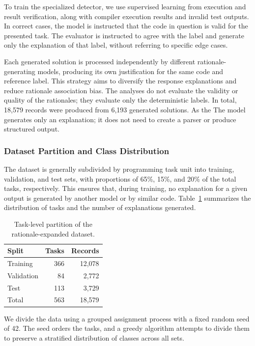 To train the specialized detector, we use supervised learning from execution and result verification, along with compiler execution results and invalid test outputs. In correct cases, the model is instructed that the code in question is valid for the presented task. The evaluator is instructed to agree with the label and generate only the explanation of that label, without referring to specific edge cases.

Each generated solution is processed independently by different rationale-generating models, producing its own justification for the same code and reference label. This strategy aims to diversify the response explanations and reduce rationale association bias. The analyses do not evaluate the validity or quality of the rationales; they evaluate only the deterministic labels. In total, 18,579 records were produced from 6,193 generated solutions. As the
The model generates only an explanation; it does not need to create a parser or produce structured output.

\subsubsection{Dataset Partition and Class Distribution}

The dataset is generally subdivided by programming task unit into training, validation, and test sets, with proportions of 65\%, 15\%, and 20\% of the total tasks, respectively. This ensures that, during training, no explanation for a given output is generated by another model or by similar code. Table~\ref{tab:dataset_split} summarizes the distribution of tasks and the number of explanations generated.

\begin{table}[htbp]
\centering
\caption{Task-level partition of the rationale-expanded dataset.}
\label{tab:dataset_split}
\begin{tabular}{lrr}
\toprule
\textbf{Split} & \textbf{Tasks} & \textbf{Records} \\
\midrule
Training & 366 & 12,078 \\
Validation & 84 & 2,772 \\
Test & 113 & 3,729 \\
\midrule
Total & 563 & 18,579 \\
\bottomrule
\end{tabular}
\end{table}

We divide the data using a grouped assignment process with a fixed random seed of 42. The seed orders the tasks, and a greedy algorithm attempts to divide them to preserve a stratified distribution of classes across all sets.

